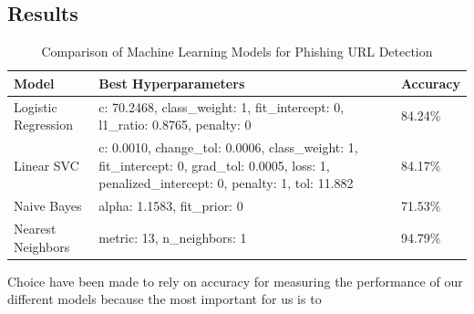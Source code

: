 \documentclass{article}
\begin{document}
    \subsection{Results}\label{subsec:results}

    \begin{table}[H]
        \centering
        \begin{tabular}{|l|p{8cm}|l|}
            \hline
            \textbf{Model}      & \textbf{Best Hyperparameters}                                                                                                                     & \textbf{Accuracy} \\ \hline
            Logistic Regression & c: 70.2468, class\_weight: 1, fit\_intercept: 0, l1\_ratio: 0.8765, penalty: 0 & 84.24\% \\ \hline
            Linear SVC          & c: 0.0010, change\_tol: 0.0006, class\_weight: 1, fit\_intercept: 0, grad\_tol: 0.0005, loss: 1, penalized\_intercept: 0, penalty: 1, tol: 11.882 & 84.17\% \\ \hline
            Naive Bayes         & alpha: 1.1583, fit\_prior: 0                                                                                                                      & 71.53\%           \\ \hline
            Nearest Neighbors   & metric: 13, n\_neighbors: 1                                                                                                                       & 94.79\%           \\ \hline
        \end{tabular}
        \caption{Comparison of Machine Learning Models for Phishing URL Detection}
        \label{tab:model_comparison}
    \end{table}

    Choice have been made to rely on accuracy for measuring the performance of our different models because the most important for us is to
\end{document}
